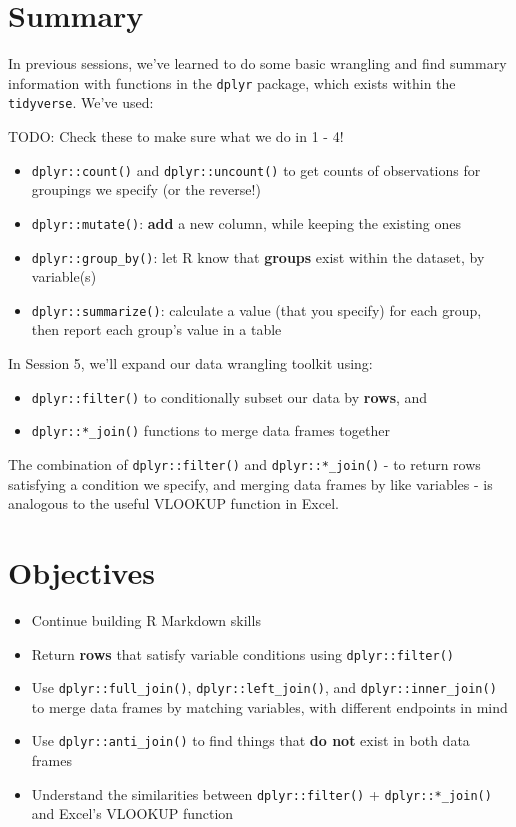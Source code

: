 \documentclass[]{book}
\providecommand{\tightlist}{%
  \setlength{\itemsep}{0pt}\setlength{\parskip}{0pt}}
\begin{document}
\hypertarget{summary-1}{%
\section{Summary}\label{summary-1}}

In previous sessions, we've learned to do some basic wrangling and find summary information with functions in the \texttt{dplyr} package, which exists within the \texttt{tidyverse}. We've used:

TODO: Check these to make sure what we do in 1 - 4!

\begin{itemize}
\tightlist
\item
  \texttt{dplyr::count()} and \texttt{dplyr::uncount()} to get counts of observations for groupings we specify (or the reverse!)
\item
  \texttt{dplyr::mutate()}: \textbf{add} a new column, while keeping the existing ones
\item
  \texttt{dplyr::group\_by()}: let R know that \textbf{groups} exist within the dataset, by variable(s)
\item
  \texttt{dplyr::summarize()}: calculate a value (that you specify) for each group, then report each group's value in a table
\end{itemize}

In Session 5, we'll expand our data wrangling toolkit using:

\begin{itemize}
\tightlist
\item
  \texttt{dplyr::filter()} to conditionally subset our data by \textbf{rows}, and
\item
  \texttt{dplyr::*\_join()} functions to merge data frames together
\end{itemize}

The combination of \texttt{dplyr::filter()} and \texttt{dplyr::*\_join()} - to return rows satisfying a condition we specify, and merging data frames by like variables - is analogous to the useful VLOOKUP function in Excel.

\hypertarget{objectives-1}{%
\section{Objectives}\label{objectives-1}}

\begin{itemize}
\tightlist
\item
  Continue building R Markdown skills
\item
  Return \textbf{rows} that satisfy variable conditions using \texttt{dplyr::filter()}
\item
  Use \texttt{dplyr::full\_join()}, \texttt{dplyr::left\_join()}, and \texttt{dplyr::inner\_join()} to merge data frames by matching variables, with different endpoints in mind
\item
  Use \texttt{dplyr::anti\_join()} to find things that \textbf{do not} exist in both data frames
\item
  Understand the similarities between \texttt{dplyr::filter()} + \texttt{dplyr::*\_join()} and Excel's VLOOKUP function
\end{itemize}
\end{document}
